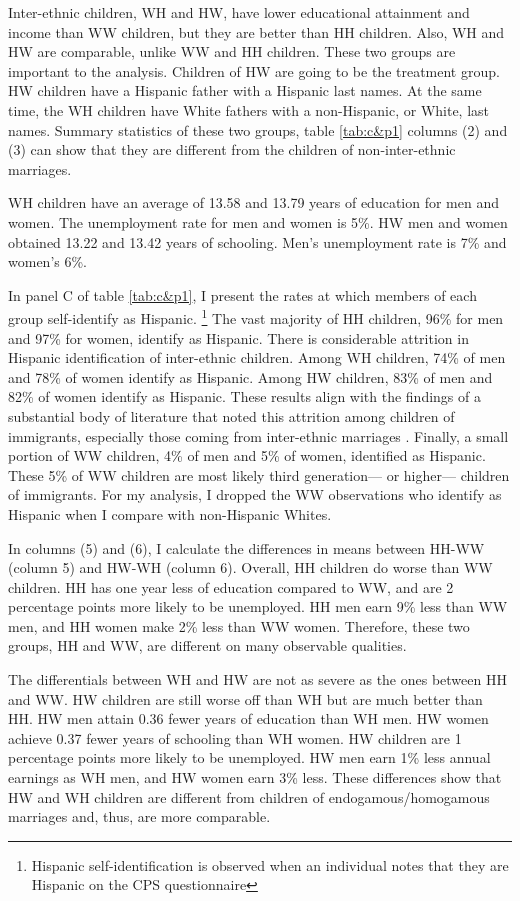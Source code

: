 \documentclass[12pt,english]{article}
\begin{document}
Inter-ethnic children, WH and HW, have lower educational attainment and income than WW children, but they are better than HH children. Also, WH and HW are comparable, unlike WW and HH children. These two groups are important to the analysis. Children of HW are going to be the treatment group. HW children have a Hispanic father with a Hispanic last names. At the same time, the WH children have White fathers with a non-Hispanic, or White, last names. Summary statistics of these two groups, table \ref{tab:c&p1} columns (2) and (3) can show that they are different from the children of non-inter-ethnic marriages. 


WH children have an average of 13.58 and 13.79 years of education for men and women. The unemployment rate for men and women is 5\%. HW men and women obtained 13.22 and 13.42 years of schooling. Men's unemployment rate is 7\% and women's 6\%.

In panel C of table \ref{tab:c&p1}, I present the rates at which members of each group self-identify as Hispanic. \footnote{Hispanic self-identification is observed when an individual notes that they are Hispanic on the CPS questionnaire} The vast majority of HH children, 96\% for men and 97\% for women, identify as Hispanic. There is considerable attrition in Hispanic identification of inter-ethnic children. Among WH children, 74\% of men and 78\% of women identify as Hispanic. Among HW children, 83\% of men and 82\% of women identify as Hispanic. These results align with the findings of a substantial body of literature that noted this attrition among children of immigrants, especially those coming from inter-ethnic marriages \autocite{duncan2017complexity, duncan2018identifying, duncan2020new, antman2020ethnic}. Finally, a small portion of WW children, 4\% of men and 5\% of women, identified as Hispanic. These 5\% of WW children are most likely third generation--- or higher--- children of immigrants. For my analysis, I dropped the WW observations who identify as Hispanic when I compare with non-Hispanic Whites.

In columns (5) and (6), I calculate the differences in means between HH-WW (column 5) and HW-WH (column 6). Overall, HH children do worse than WW children. HH has one year less of education compared to WW, and are 2 percentage points more likely to be unemployed. HH men earn 9\% less than WW men, and HH women make 2\% less than WW women. Therefore, these two groups, HH and WW, are different on many observable qualities.

The differentials between WH and HW are not as severe as the ones between HH and WW. HW children are still worse off than WH but are much better than HH. HW men attain 0.36 fewer years of education than WH men. HW women achieve 0.37 fewer years of schooling than WH women. HW children are 1 percentage points more likely to be unemployed. HW men earn 1\% less annual earnings as WH men, and HW women earn 3\% less. These differences show that HW and WH children are different from children of endogamous/homogamous marriages and, thus, are more comparable.
\end{document}
